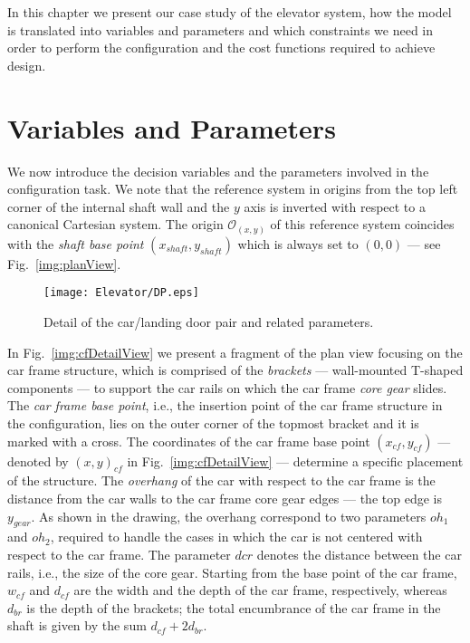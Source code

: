 In this chapter we present our case study of the elevator system,
how the model is translated into variables and parameters and which
constraints we need in order to perform the configuration and the 
cost functions required to achieve design.

\section{Variables and Parameters}
\label{sec:variables}

We now introduce the decision variables and the parameters involved
in the configuration task. We note that the 
reference system in \liftcreate{} origins from the top left corner 
of the internal shaft wall and the $y$ axis is inverted with respect 
to a canonical Cartesian system. The origin $\mathcal{O}_{(x,y)}$ of 
this reference system coincides with the \emph{shaft base point} 
$(x_{shaft}, y_{shaft})$ which is always set to $(0, 0)$ --- see 
Fig.~\ref{img:planView}. 
%
\begin{figure}[t]
	\caption{\label{img:dpDetailView} Detail of the car/landing 
		door pair and related parameters.}
	\centering
	\texttt{[image: Elevator/DP.eps]}
\end{figure}
%
In Fig.~\ref{img:cfDetailView} we 
present a fragment of the plan view focusing on the car frame structure, 
which is comprised of the \emph{brackets} --- wall-mounted T-shaped 
components --- to support the car rails on which the car frame 
\emph{core gear} slides. The \emph{car frame base point}, i.e., the 
insertion point of the car frame structure in the configuration, 
lies on the outer corner of the topmost bracket and it is marked with 
a cross. The coordinates of the car frame base point $(x_{cf},y_{cf})$ 
--- denoted by $(x,y)_{cf}$ in Fig.~\ref{img:cfDetailView} ---
determine a specific placement of the structure. The \emph{overhang}
of the car with respect to the car frame is the distance from the car
walls to the car frame core gear edges --- the top edge is $y_{gear}$.
As shown in the drawing, the overhang correspond to two parameters
$oh_1$ and $oh_2$, required to handle the cases in which the car is
not centered with respect to the car frame. The parameter $dcr$
denotes  the distance between  the car rails, i.e., the size of the 
core gear. Starting from the base point of the car frame, $w_{cf}$ 
and $d_{cf}$ are the width and the depth of the car frame, respectively, 
whereas $d_{br}$ is the depth of the brackets; the total encumbrance
of the car frame in the shaft is given by the sum $d_{cf} + 2 d_{br}$.

